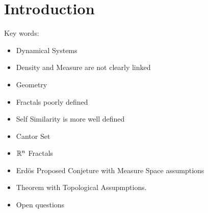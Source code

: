 \chapter{Introduction}

Key words:\begin{itemize}
    \item Dynamical Systems
    \item Density and Measure are not clearly linked
    \item Geometry
    \item Fractals poorly defined
    \item Self Similarity is more well defined
    \item Cantor Set
    \item $\mathbb{R}^n$ Fractals
    \item Erd\"{o}s Proposed Conjeture with Measure Space assumptions
    \item Theorem with Topological Assupmptions.
    \item Open questions
\end{itemize}






